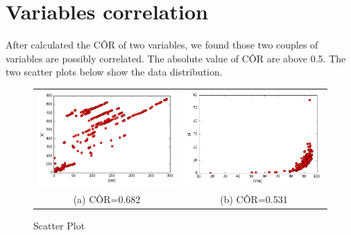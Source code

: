 \section*{ Variables correlation }
After calculated the C\^{O}R of two variables, we found those two couples of variables are possibly correlated. The absolute value of C\^{O}R are above 0.5. The two scatter plots below show the data distribution.
\begin{figure}
\begin{tabular}{cc}
  \includegraphics[width=65mm]{images/correlated/DMC_DC.png} &   \includegraphics[width=65mm]{images/correlated/FFMC_ISI.png} \\
(a) C\^{O}R=0.682 & (b) C\^{O}R=0.531 \\[6pt]
\end{tabular}
\caption{ Scatter Plot }
\end{figure}
